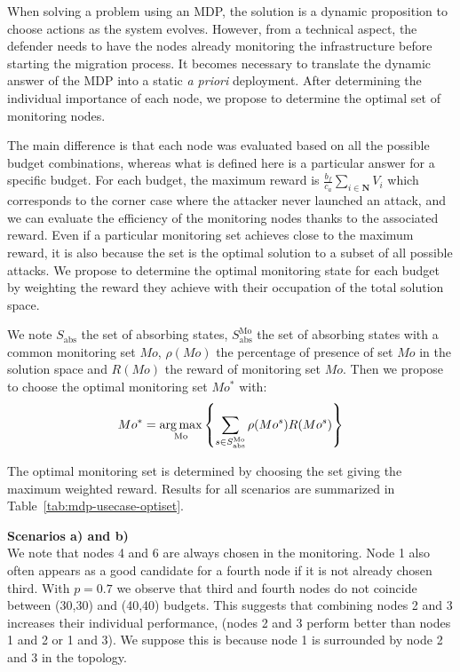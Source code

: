 When solving a problem using an MDP, the solution is a dynamic proposition to choose actions as the system evolves.
However, from a technical aspect, the defender needs to have the nodes already monitoring the infrastructure before starting the migration process.
It becomes necessary to translate the dynamic answer of the MDP into a static \textit{a priori} deployment.
After determining the individual importance of each node, we propose to determine the optimal set of monitoring nodes.

The main difference is that each node was evaluated based on all the possible budget combinations, whereas what is defined here is a particular answer for a specific budget.
For each budget, the maximum reward is $\frac{b_f}{c_a} \sum\limits_{i \in \textbf{N}}V_i $ which corresponds to the corner case where the attacker never launched an attack, and we can evaluate the efficiency of the   monitoring nodes thanks to the associated reward.
Even if a particular monitoring set achieves close to the maximum reward, it is also because the set is the optimal solution to a subset of all possible attacks.
We propose to determine the optimal monitoring state for each budget by weighting the reward they achieve with their occupation of the total solution space.

We note $S_{\text{abs}}$ the set of absorbing states, $S^{\text{Mo}}_{\text{abs}}$ the set of absorbing states with a common  monitoring set $Mo$, $\rho(Mo)$ the percentage of presence of set $Mo$ in the solution space and $R(Mo)$ the reward of monitoring set $Mo$.
Then we propose to choose the optimal monitoring set $Mo^*$ with:
\begin{equation}
    Mo^* = \operatorname*{arg\,max}\limits_{\text{Mo}} \left \{\sum\limits_{s \in S^{\text{Mo}}_{\text{abs}}}\rho(Mo^s)R(Mo^s) \right \}
\end{equation}

The optimal monitoring set is determined by choosing the set giving the maximum weighted reward.
Results for all scenarios are summarized in Table~\ref{tab:mdp-usecase-optiset}.



\textbf{Scenarios a) and b)\\}
We note that nodes 4 and 6 are always chosen in the monitoring.
Node 1 also often appears as a good candidate for a fourth node if it is not already chosen third.
With $p=0.7$ we observe that third and fourth nodes do not coincide between (30,30) and (40,40) budgets.
This suggests that combining nodes 2 and 3 increases their individual performance, (\ie nodes 2 and 3 perform better than nodes 1 and 2 or 1 and 3).
We suppose this is because node 1 is surrounded by node 2 and 3 in the topology.

